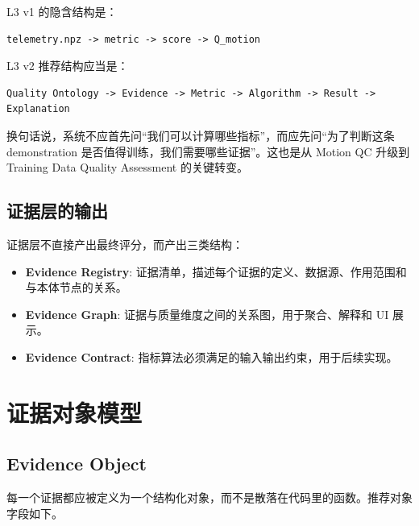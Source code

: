 \documentclass[UTF8,zihao=-4]{ctexart}
\newcommand{\Term}[1]{\textbf{#1}}
\begin{document}
L3 v1 的隐含结构是：

\begin{verbatim}
telemetry.npz -> metric -> score -> Q_motion
\end{verbatim}

L3 v2 推荐结构应当是：

\begin{verbatim}
Quality Ontology -> Evidence -> Metric -> Algorithm -> Result -> Explanation
\end{verbatim}

换句话说，系统不应首先问“我们可以计算哪些指标”，而应先问“为了判断这条 demonstration 是否值得训练，我们需要哪些证据”。这也是从 Motion QC 升级到 Training Data Quality Assessment 的关键转变。

\subsection{证据层的输出}

证据层不直接产出最终评分，而产出三类结构：

\begin{itemize}
  \item \Term{Evidence Registry}: 证据清单，描述每个证据的定义、数据源、作用范围和与本体节点的关系。
  \item \Term{Evidence Graph}: 证据与质量维度之间的关系图，用于聚合、解释和 UI 展示。
  \item \Term{Evidence Contract}: 指标算法必须满足的输入输出约束，用于后续实现。
\end{itemize}

\section{证据对象模型}

\subsection{Evidence Object}

每一个证据都应被定义为一个结构化对象，而不是散落在代码里的函数。推荐对象字段如下。
\end{document}
